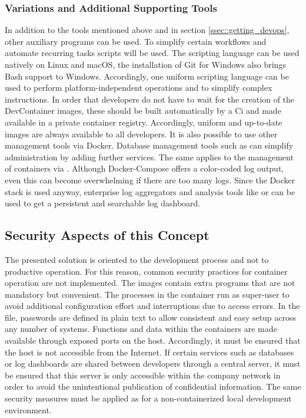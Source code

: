         \subsubsection{Variations and Additional Supporting Tools}
        In addition to the tools mentioned above and in section \ref{ssec::getting_devops}, other auxiliary programs can be used. To simplify certain workflows and automate recurring tasks scripts will be used. The  scripting language can be used natively on Linux and macOS, the installation of Git for Windows also brings Bash support to Windows. Accordingly, one uniform scripting language can be used to perform platform-independent operations and to simplify complex instructions. In order that developers do not have to wait for the creation of the DevContainer images, these should be built automatically by a Ci and made available in a private container registry. Accordingly, uniform and up-to-date images are always available to all developers. \newline
        It is also possible to use other management tools via Docker. Database management tools such as  can simplify administration by adding further services. The same applies to the management of containers via . Although Docker-Compose offers a color-coded log output, even this can become overwhelming if there are too many logs. Since the Docker stack is used anyway, enterprise log aggregators and analysis tools like  or  can be used to get a persistent and searchable log dashboard.

    \subsection{Security Aspects of this Concept}\label{ssec::sec}
    The presented solution is oriented to the development process and not to productive operation. For this reason, common security practices for container operation are not implemented. The images contain extra programs that are not mandatory but convenient. The processes in the container run as super-user to avoid additional configuration effort and interruptions due to access errors. In the  file, passwords are defined in plain text to allow consistent and easy setup across any number of systems. Functions and data within the containers are made available through exposed ports on the host. Accordingly, it must be ensured that the host is not accessible from the Internet. If certain services such as databases or log dashboards are shared between developers through a central server, it must be ensured that this server is only accessible within the company network in order to avoid the unintentional publication of confidential information. The same security measures must be applied as for a non-containerized local development environment.

